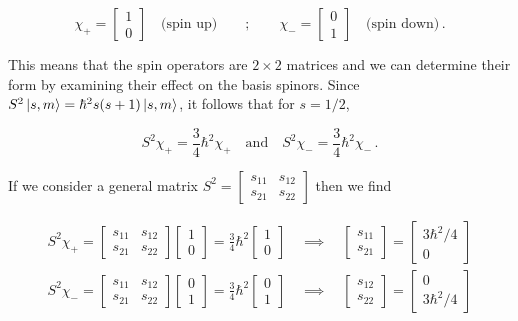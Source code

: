 \documentclass[12pt, titlepage]{article}
\begin{document}
\begin{equation}
	\chi_+ = \begin{bmatrix} 1 \\ 0 \end{bmatrix} \quad \text{(spin up)} \qquad;\qquad \chi_- = \begin{bmatrix} 0 \\ 1 \end{bmatrix} \quad \text{(spin down)} \,.
\end{equation}

This means that the spin operators are $2 \times 2$ matrices and we can determine their form by examining their effect on the basis spinors. Since $S^2\ket{s, m} = \hbar^2s(s+1)\ket{s, m}$, it follows that for $s=1/2$,

\begin{equation}
	S^2\chi_+ = \frac{3}{4}\hbar^2\chi_+ \quad\text{and}\quad S^2\chi_- = \frac{3}{4}\hbar^2\chi_- \,.
\end{equation}

If we consider a general matrix $S^2 = \begin{bmatrix} s_{11} & s_{12} \\ s_{21} & s_{22}\end{bmatrix}$ then we find

\begin{align*}
	S^2\chi_+ = \begin{bmatrix} s_{11} & s_{12} \\ s_{21} & s_{22}\end{bmatrix}\begin{bmatrix} 1 \\ 0\end{bmatrix} = \frac{3}{4}\hbar^2\begin{bmatrix} 1 \\ 0\end{bmatrix} \quad\implies\quad \begin{bmatrix} s_{11} \\ s_{21}\end{bmatrix}=\begin{bmatrix} 3\hbar^2/4 \\ 0\end{bmatrix}\\[8pt]
	S^2\chi_- = \begin{bmatrix} s_{11} & s_{12} \\ s_{21} & s_{22}\end{bmatrix}\begin{bmatrix} 0 \\ 1\end{bmatrix} = \frac{3}{4}\hbar^2\begin{bmatrix} 0 \\ 1\end{bmatrix} \quad\implies\quad \begin{bmatrix} s_{12} \\ s_{22}\end{bmatrix}=\begin{bmatrix} 0 \\ 3\hbar^2/4 \end{bmatrix}
\end{align*}
\end{document}
